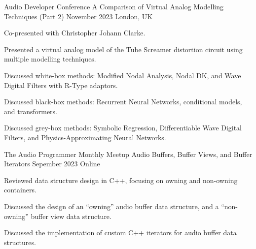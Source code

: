 

\begin{cventries}

  \cventry
    {Audio Developer Conference} %
    {A Comparison of Virtual Analog Modelling Techniques (Part 2)} %
    {November 2023} %
    {London, UK} %
    {
      \begin{cvitems} %
        \item {Co-presented with Christopher Johann Clarke.}
        \item {Presented a virtual analog model of the Tube Screamer distortion circuit using multiple modelling techniques.}
        \item {Discussed white-box methods: Modified Nodal Analysis, Nodal DK, and Wave Digital Filters with R-Type adaptors.}
        \item {Discussed black-box methods: Recurrent Neural Networks, conditional models, and transformers.}
        \item {Discussed grey-box methods: Symbolic Regression, Differentiable Wave Digital Filters, and Physics-Approximating Neural Networks.}
      \end{cvitems}
    }

\cventry
{The Audio Programmer Monthly Meetup} %
{Audio Buffers, Buffer Views, and Buffer Iterators} %
{Sepember 2023} %
{Online} %
{
  \begin{cvitems} %
    \item {Reviewed data structure design in C++, focusing on owning and non-owning containers.}
    \item {Discussed the design of an ``owning'' audio buffer data structure, and a ``non-owning'' buffer view data structure.}
    \item {Discussed the implementation of custom C++ iterators for audio buffer data structures.}
  \end{cvitems}
}


\end{cventries}
